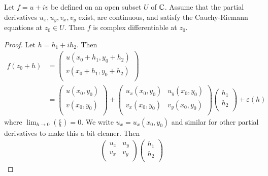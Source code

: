 \begin{theorem}
    Let $f = u + iv$ be defined on an open subset $U$ of $\mathbb{C}$. Assume that the partial derivatives $u_x, u_y, v_x, v_y$ exist, are continuous, and satisfy the Cauchy-Riemann equations at $z_0 \in U$. Then $f$ is complex differentiable at $z_0$.
\end{theorem}

\begin{proof}
    Let $h = h_1 + ih_2$. Then
    \begin{align*}
        f(z_0 + h) &= 
            \begin{pmatrix}
                u(x_0 + h_1, y_0 + h_2) \\
                v(x_0 + h_1, y_0 + h_2) \\
            \end{pmatrix}
            \\
        &=
            \begin{pmatrix}
                u(x_0, y_0) \\
                v(x_0, y_0) \\
            \end{pmatrix}
            +
            \begin{pmatrix}
                u_x(x_0, y_0) & u_y(x_0, y_0) \\
                v_x(x_0, y_0) & v_y(x_0, y_0) \\
            \end{pmatrix}
            \begin{pmatrix}
                h_1 \\
                h_2 \\
            \end{pmatrix}
            + \varepsilon(h)
    \end{align*}
    where $\lim_{h \to 0} \left(\frac{\varepsilon}{h}\right) = 0$. We write $u_x = u_x(x_0, y_0)$ and similar for other partial derivatives to make this a bit cleaner. Then
    \begin{align*}
        \begin{pmatrix}
            u_x & u_y \\
            v_x & v_y \\
        \end{pmatrix}
        \begin{pmatrix}
            h_1 \\
            h_2 \\
        \end{pmatrix}

\end{align*}
\end{proof}
